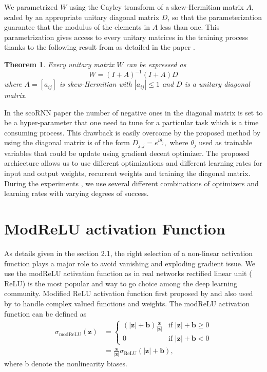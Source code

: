 \documentclass[letterpaper]{article} %
\newtheorem{theorem}{Theorem}
\begin{document}
\noindent We parametrized $W$ using the Cayley transform of a skew-Hermitian matrix $A$, scaled by an appropriate unitary diagonal matrix $D$, so that the parameterization guarantee that the modulus of the elements in $A$ less than one. This parametrization gives access to every unitary matrices in the training process thanks to the following result from \cite{kahan06} as detailed in the paper \cite{kyle17}.\\

\begin{theorem}
Every unitary matrix $W$ can be expressed as 
$$ W = (I+A)^{-1}(I+A)D$$ where $A =[a_{ij}]$ is skew-Hermitian with $|a_{ij}| \leq 1$ and $D$ is a unitary diagonal matrix.
\end{theorem}

In the scoRNN paper the number of negative ones in the diagonal matrix is set to be a hyper-parameter that one need to tune for a particular task which is a time consuming process. This drawback is easily overcome by the proposed method by using the diagonal matrix is of the form $D_{j,j} = e^{i\theta_j}, $ where $\theta_j$ used as trainable variables that could be update using gradient decent optimizer. The proposed archiecture allows us to use different optimizations and different learning rates for input and output weights, recurrent weights and training the diagonal matrix. During the experiments , we use several different combinations of optimizers and learning rates with varying degrees of success.\\

\section{ModReLU activation Function}
As details given in the section 2.1, the right selection of a non-linear activation function plays a major role to avoid vanishing and exploding gradient issue. We use the modReLU activation function as in real networks rectified linear unit ( ReLU) is the most popular and way to go choice among the deep learning community. Modified ReLU activation function first proposed by \cite{Arjo16} and also used by \cite{Wisdom16} to handle complex valued functions and weights. The modReLU activation function can be defined as 
\begin{align*}
\sigma_{\text{modReLU}}(\textbf{z}) &=\begin{cases} 
      (|\textbf{z}|+\textbf{b})\frac{\textbf{z}}{|\textbf{z}|} & \text{if } |\textbf{z}|+\textbf{b} \geq 0 \\
      0 & \text{if } |\textbf{z}|+\textbf{b} < 0
   \end{cases} \\
   &= \frac{\textbf{z}}{|\textbf{z}|}\sigma_{\text{ReLU}}(|\textbf{z}|+\textbf{b}),
\end{align*}
where b denote the nonlinearity biases.\\
\end{document}
